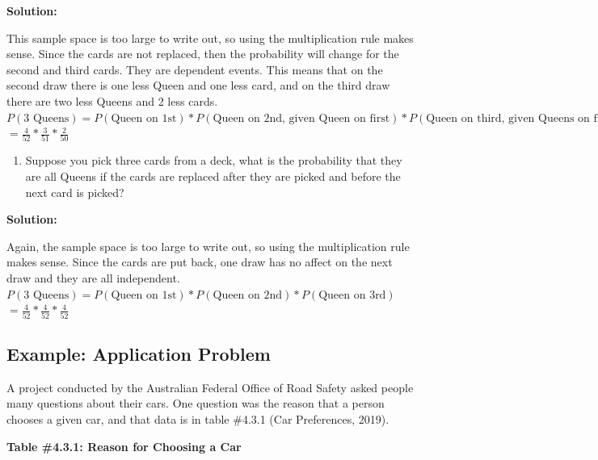 \documentclass[]{book}
\providecommand{\tightlist}{%
  \setlength{\itemsep}{0pt}\setlength{\parskip}{0pt}}
\begin{document}
\textbf{Solution:}

This sample space is too large to write out, so using the
multiplication rule makes sense. Since the cards are not replaced,
then the probability will change for the second and third cards.
They are dependent events. This means that on the second draw there
is one less Queen and one less card, and on the third draw there are
two less Queens and 2 less cards.
\(P(\text{3 Queens})=P(\text{Queen on 1st})*P(\text{Queen on 2nd, given Queen on first})*P(\text{Queen on third, given Queens on fist 2 draws})\)
\(=\frac{4}{52}*\frac{3}{51}*\frac{2}{50}\)

\begin{enumerate}
\def\labelenumi{\alph{enumi}.}
\setcounter{enumi}{1}
\tightlist
\item
  Suppose you pick three cards from a deck, what is the probability
  that they are all Queens if the cards are replaced after they are
  picked and before the next card is picked?
\end{enumerate}

\textbf{Solution:}

Again, the sample space is too large to write out, so using the multiplication rule makes sense. Since the cards are put back, one draw has no affect on the next draw and they are all independent.
\(P(\text{3 Queens})=P(\text{Queen on 1st})*P(\text{Queen on 2nd})*P(\text{Queen on 3rd})\)
\(=\frac{4}{52}*\frac{4}{52}*\frac{4}{52}\)

\hypertarget{example-application-problem}{%
\subsection{Example: Application Problem}\label{example-application-problem}}

A project conducted by the Australian Federal Office of Road Safety asked people many questions about their cars. One question was the reason that a person chooses a given car, and that data is in table \#4.3.1 (Car Preferences, 2019).

\textbf{Table \#4.3.1: Reason for Choosing a Car}
\end{document}
